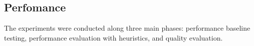 \subsection{Perfomance}
The experiments were conducted along three main phases: performance baseline testing, performance evaluation with heuristics, and quality evaluation.
